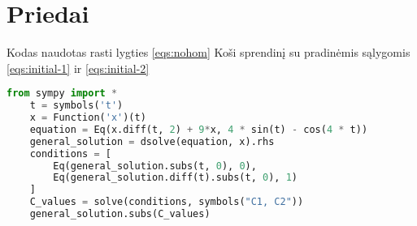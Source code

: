 \documentclass[11pt]{article}
\begin{document}
\section{Priedai}
Kodas naudotas rasti lygties \eqref{eqs:nohom} Koši sprendinį su pradinėmis sąlygomis \eqref{eqs:initial-1} ir \eqref{eqs:initial-2}
\begin{lstlisting}[language=Python]
    from sympy import *
    t = symbols('t')
    x = Function('x')(t)
    equation = Eq(x.diff(t, 2) + 9*x, 4 * sin(t) - cos(4 * t))
    general_solution = dsolve(equation, x).rhs
    conditions = [
        Eq(general_solution.subs(t, 0), 0),
        Eq(general_solution.diff(t).subs(t, 0), 1)
    ]
    C_values = solve(conditions, symbols("C1, C2"))
    general_solution.subs(C_values)
    \end{lstlisting}
\end{document}
